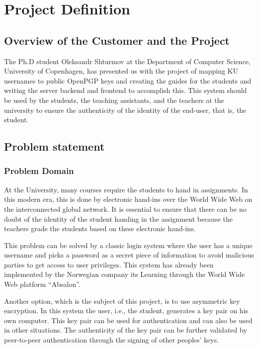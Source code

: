 \documentclass[11pt,a4paper]{report}
\begin{document}
\section{Project Definition}
\subsection{Overview of the Customer and the Project}
The Ph.D student Oleksandr Shturmov at the Department of Computer Science, University of Copenhagen, has presented us with the project of mapping KU usernames to public OpenPGP keys and creating the guides for the students and writing the server backend and frontend to accomplish this. This system should be used by the students, the teaching assistants, and the teachers at the university to ensure the authenticity of the identity of the end-user, that is, the student.
\subsection{Problem statement}
\subsubsection{Problem Domain}
At the University, many courses require the students to hand in assignments. In this modern era, this is done by electronic hand-ins over the World Wide Web on the interconnected global network. It is essential to ensure that there can be no doubt of the identity of the student handing in the assignment because the teachers grade the students based on these electronic hand-ins.

This problem can be solved by a classic login system where the user has a unique username and picks a password as a secret piece of information to avoid malicious parties to get access to user privileges. This system has already been implemented by the Norwegian company its Learning through the World Wide Web platform ``Absalon''.

Another option, which is the subject of this project, is to use asymmetric key encryption. In this system the user, i.e., the student, generates a key pair on his own computer. This key pair can be used for authentication and can also be used in other situations. The authenticity of the key pair can be further validated by peer-to-peer authentication through the signing of other peoples' keys.
\end{document}
